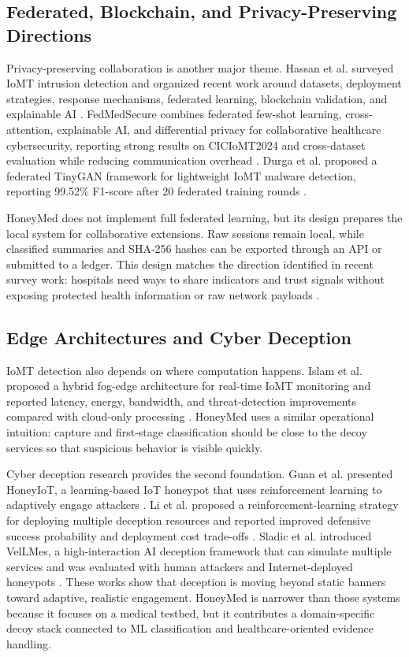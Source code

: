 \documentclass[conference, a4paper]{IEEEtran}
\begin{document}
\subsection{Federated, Blockchain, and Privacy-Preserving Directions}
Privacy-preserving collaboration is another major theme. Hassan et al. surveyed IoMT intrusion detection and organized recent work around datasets, deployment strategies, response mechanisms, federated learning, blockchain validation, and explainable AI \cite{hassan2025survey}. FedMedSecure combines federated few-shot learning, cross-attention, explainable AI, and differential privacy for collaborative healthcare cybersecurity, reporting strong results on CICIoMT2024 and cross-dataset evaluation while reducing communication overhead \cite{tawfik2025fedmedsecure}. Durga et al. proposed a federated TinyGAN framework for lightweight IoMT malware detection, reporting 99.52\% F1-score after 20 federated training rounds \cite{durga2026tinygan}.

HoneyMed does not implement full federated learning, but its design prepares the local system for collaborative extensions. Raw sessions remain local, while classified summaries and SHA-256 hashes can be exported through an API or submitted to a ledger. This design matches the direction identified in recent survey work: hospitals need ways to share indicators and trust signals without exposing protected health information or raw network payloads \cite{hassan2025survey}.

\subsection{Edge Architectures and Cyber Deception}
IoMT detection also depends on where computation happens. Islam et al. proposed a hybrid fog-edge architecture for real-time IoMT monitoring and reported latency, energy, bandwidth, and threat-detection improvements compared with cloud-only processing \cite{islam2025fogedge}. HoneyMed uses a similar operational intuition: capture and first-stage classification should be close to the decoy services so that suspicious behavior is visible quickly.

Cyber deception research provides the second foundation. Guan et al. presented HoneyIoT, a learning-based IoT honeypot that uses reinforcement learning to adaptively engage attackers \cite{guan2025honeyiot}. Li et al. proposed a reinforcement-learning strategy for deploying multiple deception resources and reported improved defensive success probability and deployment cost trade-offs \cite{li2025deception}. Sladic et al. introduced VelLMes, a high-interaction AI deception framework that can simulate multiple services and was evaluated with human attackers and Internet-deployed honeypots \cite{sladic2025vellmes}. These works show that deception is moving beyond static banners toward adaptive, realistic engagement. HoneyMed is narrower than those systems because it focuses on a medical testbed, but it contributes a domain-specific decoy stack connected to ML classification and healthcare-oriented evidence handling.
\end{document}
